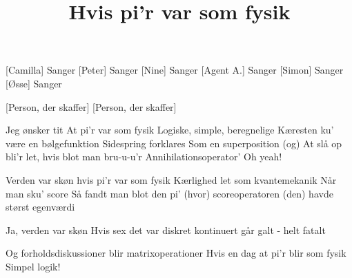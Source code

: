 \documentclass[a4paper,11pt]{article}
\title{Hvis pi'r var som fysik}
\begin{document}
\maketitle


\begin{roles}
[Camilla] Sanger
[Peter] Sanger
[Nine] Sanger
[Agent A.] Sanger
[Simon] Sanger
[Øsse] Sanger
\end{roles}

\begin{props}
    [Person, der skaffer]
    [Person, der skaffer]
\end{props}

\begin{song}

 Jeg ønsker tit
At pi'r var som fysik
Logiske, simple, beregnelige
Kæresten ku' være en bølgefunktion
Sidespring forklares
Som en superposition
(og) At slå op bli'r let, hvis blot man bru-u-u'r
Annihilationsoperator'
Oh yeah!

 Verden var skøn
hvis pi'r var som fysik
Kærlighed let
som kvantemekanik
Når man sku' score
Så fandt man blot den pi'
(hvor) scoreoperatoren
(den) havde størst egenværdi

 Ja, verden var skøn
Hvis sex det var diskret
kontinuert går galt - helt fatalt

 Og forholdsdiskussioner
blir matrixoperationer
Hvis en dag at pi'r
blir som fysik
Simpel logik!
\end{song}
\end{document}
